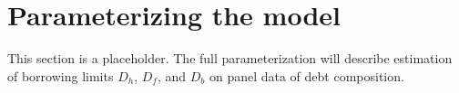 \documentclass[\latexroot/\projectname]{subfiles}
\begin{document}
\section{Parameterizing the model}
\whenintegrated{\label{sec:parameters}}
\whenintegrated{\label{sec:splurge}}
\whenintegrated{\label{sec:SCFdata}}
\whenintegrated{\label{sec:estimBetas}}

This section is a placeholder. The full parameterization will describe estimation of borrowing limits $D_h$, $D_f$, and $D_b$ on panel data of debt composition.

\smartbib
\end{document}
